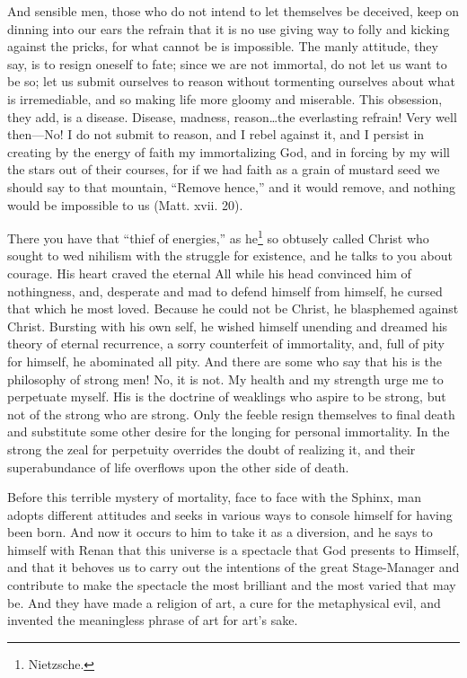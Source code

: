 And sensible men, those who do not intend to let themselves be
deceived, keep on dinning into our ears the refrain that it is no use
giving way to folly and kicking against the pricks, for what cannot be
is impossible. The manly attitude, they say, is to resign oneself to
fate; since we are not immortal, do not let us want to be so; let us
submit ourselves to reason without tormenting ourselves about what is
irremediable, and so making life more gloomy and miserable. This
obsession, they add, is a disease. Disease, madness, reason\ldots the
everlasting refrain! Very well then---No! I do not submit to reason,
and I rebel against it, and I persist in creating by the energy of
faith my immortalizing God, and in forcing by my will the stars out of
their courses, for if we had faith as a grain of mustard seed we
should say to that mountain, ``Remove hence,'' and it would remove,
and nothing would be impossible to us (Matt. xvii. 20).

There you have that ``thief of energies,'' as he\footnote{Nietzsche.}
so obtusely called Christ who sought to wed nihilism with the struggle
for existence, and he talks to you about courage. His heart craved the
eternal All while his head convinced him of nothingness, and,
desperate and mad to defend himself from himself, he cursed that which
he  most loved. Because he could not be Christ, he blasphemed
against Christ. Bursting with his own self, he wished himself unending
and dreamed his theory of eternal recurrence, a sorry counterfeit of
immortality, and, full of pity for himself, he abominated all pity.
And there are some who say that his is the philosophy of strong men!
No, it is not. My health and my strength urge me to perpetuate myself.
His is the doctrine of weaklings who aspire to be strong, but not of
the strong who are strong. Only the feeble resign themselves to final
death and substitute some other desire for the longing for personal
immortality. In the strong the zeal for perpetuity overrides the doubt
of realizing it, and their superabundance of life overflows upon the
other side of death.

Before this terrible mystery of mortality, face to face with the
Sphinx, man adopts different attitudes and seeks in various ways to
console himself for having been born. And now it occurs to him to take
it as a diversion, and he says to himself with Renan that this
universe is a spectacle that God presents to Himself, and that it
behoves us to carry out the intentions of the great Stage-Manager and
contribute to make the spectacle the most brilliant and the most
varied that may be. And they have made a religion of art, a cure for
the metaphysical evil, and invented the meaningless phrase of art for
art's sake.

